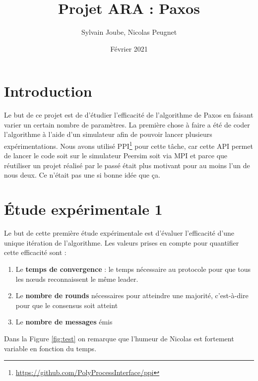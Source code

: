 \documentclass[french]{article}
\title{Projet ARA : Paxos}
\date{Février 2021}
\author{Sylvain Joube, Nicolas Peugnet}
\begin{document}
\maketitle

\tableofcontents

\section{Introduction}

Le but de ce projet est de d'étudier l'efficacité de l'algorithme de Paxos en faisant varier un certain nombre de paramètres.
La première chose à faire a été de coder l'algorithme à l'aide d'un simulateur afin de pouvoir lancer plusieurs expérimentations.
Nous avons utilisé PPI\footnote{\url{https://github.com/PolyProcessInterface/ppi}} pour cette tâche,
car cette API permet de lancer le code soit sur le simulateur Peersim soit via MPI et parce que réutiliser un projet réalisé par le passé était plus motivant pour au moins l'un de nous deux.
Ce n'était pas une si bonne idée que ça.

\section{Étude expérimentale 1}

Le but de cette première étude expérimentale est d'évaluer l'efficacité d'une unique itération de l'algorithme.
Les valeurs prises en compte pour quantifier cette efficacité sont :

\begin{enumerate}
	\item Le \textbf{temps de convergence} : le temps nécessaire au protocole pour que tous les nœuds reconnaissent le même leader.
	\item Le \textbf{nombre de rounds} nécessaires pour atteindre une majorité, c’est-à-dire pour que le consensus soit atteint
	\item Le \textbf{nombre de messages} émis
\end{enumerate}

Dans la Figure \ref{fig:test} on remarque que l'humeur de Nicolas est fortement variable en fonction du temps.
\end{document}
